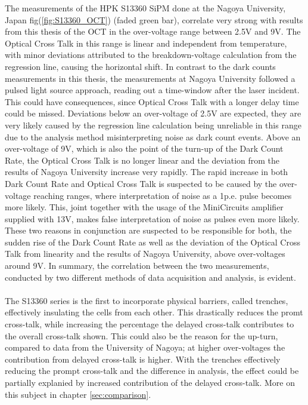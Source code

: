 \documentclass[12pt,article,type=msc,colorback,accentcolor=tud9c]{tudthesis}
\begin{document}
The measurements of the HPK S13360 SiPM done at the Nagoya University, Japan fig(\ref{fig:S13360_OCT}) (faded green bar), correlate very strong with results from this thesis of the OCT in the over-voltage range between 2.5V and 9V. The Optical Cross Talk in this range is linear and independent from temperature, with minor deviations attributed to the breakdown-voltage calculation from the regression line, causing the horizontal shift. In contrast to the dark counts measurements in this thesis, the measurements at Nagoya University followed a pulsed light source approach, reading out a time-window after the laser incident. This could have consequences, since Optical Cross Talk with a longer delay time could be missed. Deviations below an over-voltage of 2.5V are expected, they are very likely caused by the regression line calculation being unreliable in this range due to the analysis method misinterpreting noise as dark count events. Above an over-voltage of 9V, which is also the point of the turn-up of the Dark Count Rate, the Optical Cross Talk is no longer linear and the deviation from the results of Nagoya University increase very rapidly. The rapid increase in both Dark Count Rate and Optical Cross Talk is suspected to be caused by the over-voltage reaching ranges, where interpretation of noise as a 1p.e. pulse becomes more likely. This, joint together with the usage of the MiniCircuits amplifier supplied with 13V, makes false interpretation of noise as pulses even more likely. These two reasons in conjunction are suspected to be responsible for both, the sudden rise of the Dark Count Rate as well as the deviation of the Optical Cross Talk from linearity and the results of Nagoya University, above over-voltages around 9V. In summary, the correlation between the two measurements, conducted by two different methods of data acquisition and analysis, is evident.\\\\

The S13360 series is the first to incorporate physical barriers, called trenches, effectively insulating the cells from each other. This drastically reduces the promt cross-talk, while increasing the percentage the delayed cross-talk contributes to the overall cross-talk shown. This could also be the reason for the up-turn, compared to data from the University of Nagoya; at higher over-voltages the contribution from delayed cross-talk is higher\cite{DelayedOCT}. With the trenches effectively reducing the prompt cross-talk and the difference in analysis, the effect could be partially explanied by increased contribution of the delayed cross-talk. More on this subject in chapter {\ref{sec:comparison}}.
\end{document}
